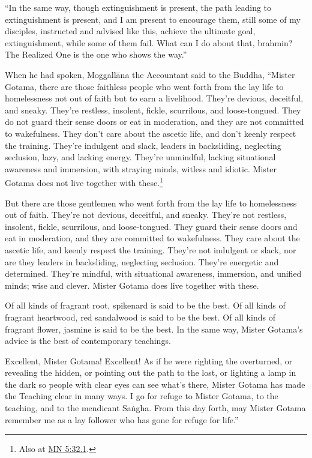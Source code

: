 \documentclass[12pt,openany]{book}%
\begin{document}
“In the same way, though extinguishment is present, the path leading to extinguishment is present, and I am present to encourage them, still some of my disciples, instructed and advised like this, achieve the ultimate goal, extinguishment, while some of them fail. What can I do about that, brahmin? The Realized One is the one who shows the way.” 

When he had spoken, \textsanskrit{Moggallāna} the Accountant said to the Buddha, “Mister Gotama, there are those faithless people who went forth from the lay life to homelessness not out of faith but to earn a livelihood. They’re devious, deceitful, and sneaky. They’re restless, insolent, fickle, scurrilous, and loose-tongued. They do not guard their sense doors or eat in moderation, and they are not committed to wakefulness. They don’t care about the ascetic life, and don’t keenly respect the training. They’re indulgent and slack, leaders in backsliding, neglecting seclusion, lazy, and lacking energy. They’re unmindful, lacking situational awareness and immersion, with straying minds, witless and idiotic. Mister Gotama does not live together with these.\footnote{Also at \href{https://suttacentral.net/mn5/en/sujato\#32.1}{MN 5:32.1}. } 

But there are those gentlemen who went forth from the lay life to homelessness out of faith. They’re not devious, deceitful, and sneaky. They’re not restless, insolent, fickle, scurrilous, and loose-tongued. They guard their sense doors and eat in moderation, and they are committed to wakefulness. They care about the ascetic life, and keenly respect the training. They’re not indulgent or slack, nor are they leaders in backsliding, neglecting seclusion. They’re energetic and determined. They’re mindful, with situational awareness, immersion, and unified minds; wise and clever. Mister Gotama does live together with these. 

Of all kinds of fragrant root, spikenard is said to be the best. Of all kinds of fragrant heartwood, red sandalwood is said to be the best. Of all kinds of fragrant flower, jasmine is said to be the best. In the same way, Mister Gotama’s advice is the best of contemporary teachings. 

Excellent, Mister Gotama! Excellent! As if he were righting the overturned, or revealing the hidden, or pointing out the path to the lost, or lighting a lamp in the dark so people with clear eyes can see what’s there, Mister Gotama has made the Teaching clear in many ways. I go for refuge to Mister Gotama, to the teaching, and to the mendicant \textsanskrit{Saṅgha}. From this day forth, may Mister Gotama remember me as a lay follower who has gone for refuge for life.” 
\end{document}
